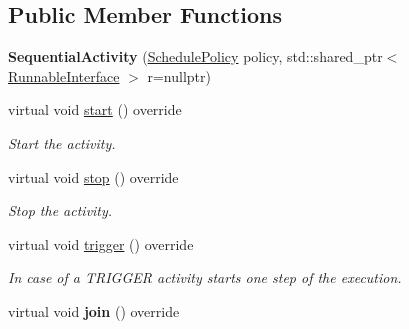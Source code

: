 \subsection*{Public Member Functions}
\begin{DoxyCompactItemize}
\item 
\hypertarget{classcoco_1_1_sequential_activity_ac7ba1d0816d9ab6cbf43493e64e48ecd}{}{\bfseries Sequential\+Activity} (\hyperlink{structcoco_1_1_schedule_policy}{Schedule\+Policy} policy, std\+::shared\+\_\+ptr$<$ \hyperlink{classcoco_1_1_runnable_interface}{Runnable\+Interface} $>$ r=nullptr)\label{classcoco_1_1_sequential_activity_ac7ba1d0816d9ab6cbf43493e64e48ecd}

\item 
\hypertarget{classcoco_1_1_sequential_activity_a29995fe18e3162f0c04787d7db9bda19}{}virtual void \hyperlink{classcoco_1_1_sequential_activity_a29995fe18e3162f0c04787d7db9bda19}{start} () override\label{classcoco_1_1_sequential_activity_a29995fe18e3162f0c04787d7db9bda19}

\begin{DoxyCompactList}\small\item\em Start the activity. \end{DoxyCompactList}\item 
\hypertarget{classcoco_1_1_sequential_activity_ab1d6827509bee10cd26bbfae3b5fb857}{}virtual void \hyperlink{classcoco_1_1_sequential_activity_ab1d6827509bee10cd26bbfae3b5fb857}{stop} () override\label{classcoco_1_1_sequential_activity_ab1d6827509bee10cd26bbfae3b5fb857}

\begin{DoxyCompactList}\small\item\em Stop the activity. \end{DoxyCompactList}\item 
\hypertarget{classcoco_1_1_sequential_activity_a9e619d6d2df7e843cbbfeacd99193446}{}virtual void \hyperlink{classcoco_1_1_sequential_activity_a9e619d6d2df7e843cbbfeacd99193446}{trigger} () override\label{classcoco_1_1_sequential_activity_a9e619d6d2df7e843cbbfeacd99193446}

\begin{DoxyCompactList}\small\item\em In case of a T\+R\+I\+G\+G\+E\+R activity starts one step of the execution. \end{DoxyCompactList}\item 
\hypertarget{classcoco_1_1_sequential_activity_a1c7cbd23c32dd76d7df9c31b425b51bc}{}virtual void {\bfseries join} () override\label{classcoco_1_1_sequential_activity_a1c7cbd23c32dd76d7df9c31b425b51bc}

\end{DoxyCompactItemize}
